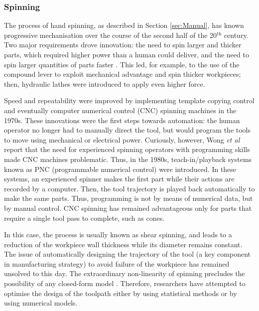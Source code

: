 \subsubsection*{Spinning}

The process of hand spinning, as described in Section \ref{sec:Manual}, has known progressive mechanisation over the course of the second half of the 20$^{\text{th}}$ century. Two major requirements drove innovation: the need to spin larger and thicker parts, which required higher power than a human could deliver, and the need to spin larger quantities of parts faster \citep{Wong2003AProcesses}. This led, for example, to the use of the compound lever to exploit mechanical advantage and spin thicker workpieces; then, hydraulic lathes were introduced to apply even higher force. 

Speed and repeatability were improved by implementing template copying control and eventually computer numerical control (CNC) spinning machines in the 1970s. These innovations were the first steps towards automation: the human operator no longer had to manually direct the tool, but would program the tools to move using mechanical or electrical power. Curiously, however, Wong \textit{et al} \citet{Wong2003AProcesses} report that the need for experienced spinning operators with programming skills made CNC machines problematic. Thus, in the 1980s, teach-in/playback systems known as PNC (programmable numerical control) were introduced. In these systems, an experienced spinner makes the first part while their actions are recorded by a computer. Then, the tool trajectory is played back automatically to make the same parts. Thus, programming is not by means of numerical data, but by manual control. CNC spinning has remained advantageous only for parts that require a single tool pass to complete, such as cones. %

In this case, the process is usually known as shear spinning, and leads to a reduction of the workpiece wall thickness while its diameter remains constant. The issue of automatically designing the trajectory of the tool (a key component in manufacturing strategy) to avoid failure of the workpiece has remained unsolved to this day. The extraordinary non-linearity of spinning precludes the possibility of any closed-form model \citep{Music2010ASpinning}. Therefore, researchers have attempted to optimise the design of the toolpath either by using statistical methods or by using numerical models. 

